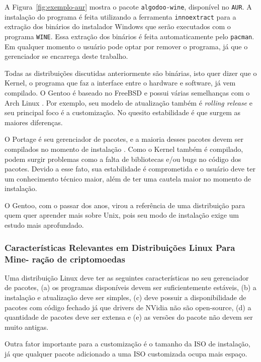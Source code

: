 \documentclass[
article,			%
12pt,				%
openright,			%
oneside,			%
a4paper,			%
chapter=TITLE,		%
section=TITLE,		%
subsection=TITLE,	%
subsubsection=TITLE,%
subsubsubsection=TITLE, %
english,			%
brazil,				%
]{abntex2}
\def\code#1{\texttt{#1}}
\begin{document}
A Figura~\ref{fig:exemplo-aur} mostra o pacote \code{algodoo-wine},
disponível no \code{AUR}. A instalação do programa é feita utilizando
a ferramenta \code{innoextract} para a extração dos binários do
instalador Windows que serão executados com o programa \code{WINE}.
Essa extração dos binários é feita automaticamente pelo \code{pacman}.
Em qualquer momento o usuário pode optar por remover o programa, já
que o gerenciador se encarrega deste trabalho.


Todas as distribuições discutidas anteriormente são binárias, isto
quer dizer que o Kernel, o programa que faz a interface entre o
hardware e software, já vem compilado. O Gentoo é baseado no FreeBSD e
possui várias semelhanças com o Arch Linux \cite{GentooFundation2018}.
Por exemplo, seu modelo de atualização também é \emph{rolling release}
e seu principal foco é a customização. No quesito estabilidade é que
surgem as maiores diferenças.

O Portage é seu gerenciador de pacotes, e a maioria desses pacotes
devem ser compilados no momento de instalação \cite{GentooWiki2018}.
Como o Kernel também é compilado, podem surgir problemas como a falta
de bibliotecas e/ou bugs no código dos pacotes. Devido a esse fato,
sua estabilidade é comprometida e o usuário deve ter um conhecimento
técnico maior, além de ter uma cautela maior no momento de instalação.

O Gentoo, com o passar dos anos, virou a referência de uma
distribuição para quem quer aprender mais sobre Unix, pois seu modo de
instalação exige um estudo mais aprofundado.

\subsubsection{Características Relevantes em Distribuições Linux Para Mine-
ração de criptomoedas}

Uma distribuição Linux deve ter as seguintes características no seu
gerenciador de pacotes, (a) os programas disponíveis devem ser
suficientemente estáveis, (b) a instalação e atualização deve ser
simples, (c) deve possuir a disponibilidade de pacotes com código
fechado já que drivers de NVidia não são open-source, (d) a quantidade
de pacotes deve ser extensa e (e) as versões do pacote não devem ser
muito antigas.

Outra fator importante para a customização é o tamanho da ISO de
instalação, já que qualquer pacote adicionado a uma ISO customizada
ocupa mais espaço.
\end{document}
